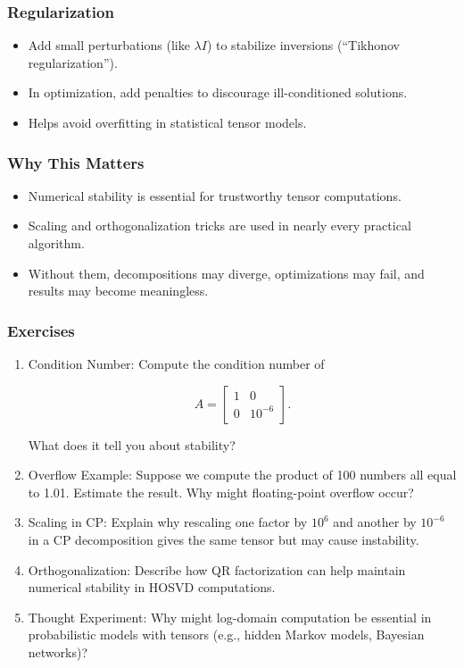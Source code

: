 \documentclass[
  letterpaper,
  DIV=11,
  numbers=noendperiod]{scrreprt}
\providecommand{\tightlist}{%
  \setlength{\itemsep}{0pt}\setlength{\parskip}{0pt}}
\begin{document}
\subsubsection{Regularization}\label{regularization}

\begin{itemize}
\tightlist
\item
  Add small perturbations (like \(\lambda I\)) to stabilize inversions
  (``Tikhonov regularization'').
\item
  In optimization, add penalties to discourage ill-conditioned
  solutions.
\item
  Helps avoid overfitting in statistical tensor models.
\end{itemize}

\subsubsection{Why This Matters}\label{why-this-matters-41}

\begin{itemize}
\tightlist
\item
  Numerical stability is essential for trustworthy tensor computations.
\item
  Scaling and orthogonalization tricks are used in nearly every
  practical algorithm.
\item
  Without them, decompositions may diverge, optimizations may fail, and
  results may become meaningless.
\end{itemize}

\subsubsection{Exercises}\label{exercises-55}

\begin{enumerate}
\def\labelenumi{\arabic{enumi}.}
\item
  Condition Number: Compute the condition number of

  \[
  A = \begin{bmatrix}1 & 0 \\ 0 & 10^{-6}\end{bmatrix}.
  \]

  What does it tell you about stability?
\item
  Overflow Example: Suppose we compute the product of 100 numbers all
  equal to 1.01. Estimate the result. Why might floating-point overflow
  occur?
\item
  Scaling in CP: Explain why rescaling one factor by \(10^6\) and
  another by \(10^{-6}\) in a CP decomposition gives the same tensor but
  may cause instability.
\item
  Orthogonalization: Describe how QR factorization can help maintain
  numerical stability in HOSVD computations.
\item
  Thought Experiment: Why might log-domain computation be essential in
  probabilistic models with tensors (e.g., hidden Markov models,
  Bayesian networks)?
\end{enumerate}
\end{document}

